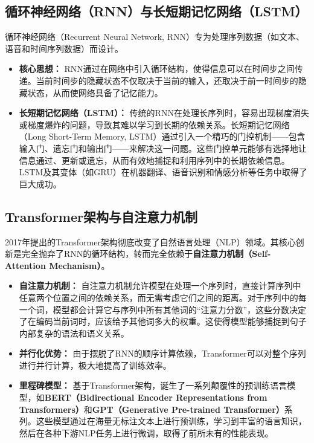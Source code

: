 \subsection{循环神经网络（RNN）与长短期记忆网络（LSTM）}
\label{ssec:rnn_lstm}
循环神经网络（Recurrent Neural Network, RNN）专为处理序列数据（如文本、语音和时间序列数据）而设计。
\begin{itemize}
    \item \textbf{核心思想：} RNN通过在网络中引入循环结构，使得信息可以在时间步之间传递。当前时间步的隐藏状态不仅取决于当前的输入，还取决于前一时间步的隐藏状态，从而使网络具备了记忆能力。
    \item \textbf{长短期记忆网络（LSTM）：} 传统的RNN在处理长序列时，容易出现梯度消失或梯度爆炸的问题，导致其难以学习到长期的依赖关系。长短期记忆网络（Long Short-Term Memory, LSTM）通过引入一个精巧的门控机制——包含输入门、遗忘门和输出门——来解决这一问题。这些门控单元能够有选择地让信息通过、更新或遗忘，从而有效地捕捉和利用序列中的长期依赖信息。LSTM及其变体（如GRU）在机器翻译、语音识别和情感分析等任务中取得了巨大成功。
\end{itemize}

\subsection{Transformer架构与自注意力机制}
\label{ssec:transformer}
2017年提出的Transformer架构彻底改变了自然语言处理（NLP）领域。其核心创新是完全抛弃了RNN的循环结构，转而完全依赖于\textbf{自注意力机制（Self-Attention Mechanism）}。
\begin{itemize}
    \item \textbf{自注意力机制：} 自注意力机制允许模型在处理一个序列时，直接计算序列中任意两个位置之间的依赖关系，而无需考虑它们之间的距离。对于序列中的每一个词，模型都会计算它与序列中所有其他词的“注意力分数”，这些分数决定了在编码当前词时，应该给予其他词多大的权重。这使得模型能够捕捉到句子内部复杂的语法和语义关系。
    \item \textbf{并行化优势：} 由于摆脱了RNN的顺序计算依赖，Transformer可以对整个序列进行并行计算，极大地提高了训练效率。
    \item \textbf{里程碑模型：} 基于Transformer架构，诞生了一系列颠覆性的预训练语言模型，如\textbf{BERT（Bidirectional Encoder Representations from Transformers）}和\textbf{GPT（Generative Pre-trained Transformer）}系列。这些模型通过在海量无标注文本上进行预训练，学习到丰富的语言知识，然后在各种下游NLP任务上进行微调，取得了前所未有的性能表现。
\end{itemize}

